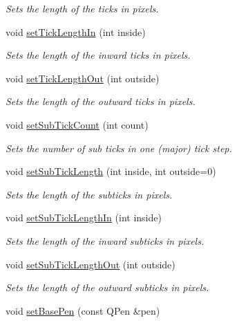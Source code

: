 \begin{DoxyCompactItemize}
\begin{DoxyCompactList}\small\item\em Sets the length of the ticks in pixels. \end{DoxyCompactList}\item 
void \hyperlink{classQCPAxis_afae1a37a99611366275a51204d991739}{set\+Tick\+Length\+In} (int inside)
\begin{DoxyCompactList}\small\item\em Sets the length of the inward ticks in pixels. \end{DoxyCompactList}\item 
void \hyperlink{classQCPAxis_a3b8a0debd1ffedd2c22d0592dfbb4e62}{set\+Tick\+Length\+Out} (int outside)
\begin{DoxyCompactList}\small\item\em Sets the length of the outward ticks in pixels. \end{DoxyCompactList}\item 
void \hyperlink{classQCPAxis_a4b1554ead9d7f9799650d51383e326dd}{set\+Sub\+Tick\+Count} (int count)
\begin{DoxyCompactList}\small\item\em Sets the number of sub ticks in one (major) tick step. \end{DoxyCompactList}\item 
void \hyperlink{classQCPAxis_ab702d6fd42fc620607435339a1c2a2e1}{set\+Sub\+Tick\+Length} (int inside, int outside=0)
\begin{DoxyCompactList}\small\item\em Sets the length of the subticks in pixels. \end{DoxyCompactList}\item 
void \hyperlink{classQCPAxis_ac46fa2a993a9f5789540977610acf1de}{set\+Sub\+Tick\+Length\+In} (int inside)
\begin{DoxyCompactList}\small\item\em Sets the length of the inward subticks in pixels. \end{DoxyCompactList}\item 
void \hyperlink{classQCPAxis_a4c6dfc3963492ed72a77724012df5f23}{set\+Sub\+Tick\+Length\+Out} (int outside)
\begin{DoxyCompactList}\small\item\em Sets the length of the outward subticks in pixels. \end{DoxyCompactList}\item 
void \hyperlink{classQCPAxis_a778d45fb71b3c7ab3bb7079e18b058e4}{set\+Base\+Pen} (const Q\+Pen \&pen)

\end{DoxyCompactItemize}
